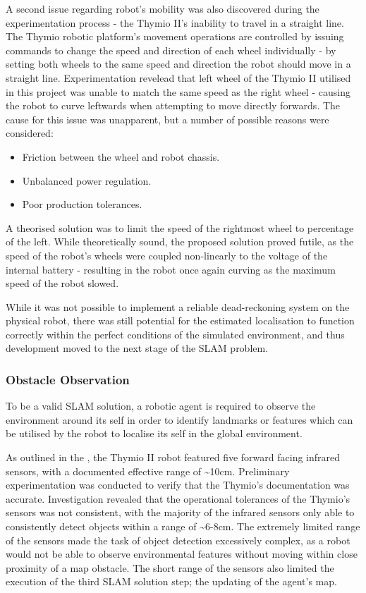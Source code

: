 A second issue regarding robot's mobility was also discovered during the
experimentation process - the Thymio II's inability to travel in a straight
line.  
The Thymio robotic platform's movement operations are controlled by issuing
commands to change the speed and direction of each wheel individually - by
setting both wheels to the same speed and direction the robot should move in a
straight line.
Experimentation revelead that left wheel of the Thymio II utilised in this
project was unable to match the same speed as the right wheel - causing the
robot to curve leftwards when attempting to move directly forwards.
The cause for this issue was unapparent, but a number of possible reasons were
considered:

\begin{itemize}
\item Friction between the wheel and robot chassis.
\item Unbalanced power regulation.
\item Poor production tolerances.
\end{itemize}

A theorised solution was to limit the speed of the rightmost wheel to
percentage of the left.
While theoretically sound, the proposed solution proved futile, as the speed of
the robot's wheels were coupled non-linearly to the voltage of the internal
battery - resulting in the robot once again curving as the maximum speed of
the robot slowed.

While it was not possible to implement a reliable dead-reckoning
system on the physical robot, there was still potential for the estimated
localisation to function correctly within the perfect conditions of the
simulated environment, and thus development moved to the next stage of the
SLAM problem.

\subsubsection{Obstacle Observation}
To be a valid SLAM solution, a robotic agent is required to observe the
environment around its self in order to identify landmarks or features which
can be utilised by the robot to localise its self in the global environment.

As outlined in the , the Thymio II robot featured five
forward facing infrared sensors, with a documented effective range of \~{}10cm.
Preliminary experimentation was conducted to verify that the Thymio's
documentation was accurate.
Investigation revealed that the operational tolerances of the Thymio's sensors
was not consistent, with the majority of the infrared sensors only able to
consistently detect objects within a range of \~{}6-8cm.
The extremely limited range of the sensors made the task of object detection
excessively complex, as a robot would not be able to observe environmental
features without moving within close proximity of a map obstacle.
The short range of the sensors also limited the execution of the third SLAM
solution step; the updating of the agent's map.

